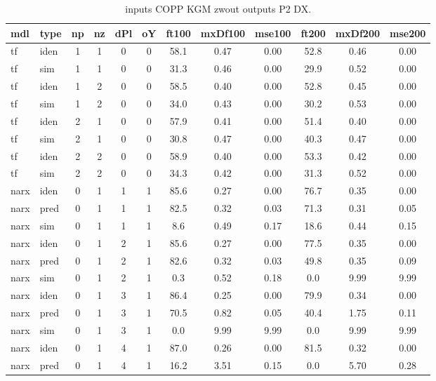 \begin{landscape}
\begin{center} 
\footnotesize
\begin{longtable}{ll|cccc|ccc|ccc} 
\caption[inputs COPP KGM zwout   outputs P2 DX]{inputs COPP KGM zwout   outputs P2 DX.} 
\label{tab:inputs_COPP_KGM_zwout___outputs_P2_DX} 
\hline 
  mdl & type & np & nz & dPl & oY & ft100 & mxDf100 & mse100 & ft200 & mxDf200 & mse200 \\ 
 \hline 
tf  & iden & 1 & 1 & 0 & 0 & 58.1 & 0.47 & 0.00 & 52.8 & 0.46 & 0.00 \\ 
tf  & sim & 1 & 1 & 0 & 0 & 31.3 & 0.46 & 0.00 & 29.9 & 0.52 & 0.00 \\ 
 \hline 
tf  & iden & 1 & 2 & 0 & 0 & 58.5 & 0.40 & 0.00 & 52.8 & 0.45 & 0.00 \\ 
tf  & sim & 1 & 2 & 0 & 0 & 34.0 & 0.43 & 0.00 & 30.2 & 0.53 & 0.00 \\ 
 \hline 
tf  & iden & 2 & 1 & 0 & 0 & 57.9 & 0.41 & 0.00 & 51.4 & 0.40 & 0.00 \\ 
tf  & sim & 2 & 1 & 0 & 0 & 30.8 & 0.47 & 0.00 & 40.3 & 0.47 & 0.00 \\ 
 \hline 
tf  & iden & 2 & 2 & 0 & 0 & 58.9 & 0.40 & 0.00 & 53.3 & 0.42 & 0.00 \\ 
tf  & sim & 2 & 2 & 0 & 0 & 34.3 & 0.42 & 0.00 & 31.3 & 0.52 & 0.00 \\ 
 \hline 
narx & iden & 0 & 1 & 1 & 1 & 85.6 & 0.27 & 0.00 & 76.7 & 0.35 & 0.00 \\ 
narx & pred & 0 & 1 & 1 & 1 & 82.5 & 0.32 & 0.03 & 71.3 & 0.31 & 0.05 \\ 
narx & sim & 0 & 1 & 1 & 1 & 8.6 & 0.49 & 0.17 & 18.6 & 0.44 & 0.15 \\ 
 \hline 
narx & iden & 0 & 1 & 2 & 1 & 85.6 & 0.27 & 0.00 & 77.5 & 0.35 & 0.00 \\ 
narx & pred & 0 & 1 & 2 & 1 & 82.6 & 0.32 & 0.03 & 49.8 & 0.35 & 0.09 \\ 
narx & sim & 0 & 1 & 2 & 1 & 0.3 & 0.52 & 0.18 & 0.0 & 9.99 & 9.99 \\ 
 \hline 
narx & iden & 0 & 1 & 3 & 1 & 86.4 & 0.25 & 0.00 & 79.9 & 0.34 & 0.00 \\ 
narx & pred & 0 & 1 & 3 & 1 & 70.5 & 0.82 & 0.05 & 40.4 & 1.75 & 0.11 \\ 
narx & sim & 0 & 1 & 3 & 1 & 0.0 & 9.99 & 9.99 & 0.0 & 9.99 & 9.99 \\ 
 \hline 
narx & iden & 0 & 1 & 4 & 1 & 87.0 & 0.26 & 0.00 & 81.5 & 0.32 & 0.00 \\ 
narx & pred & 0 & 1 & 4 & 1 & 16.2 & 3.51 & 0.15 & 0.0 & 5.70 & 0.28 \\ 

\end{longtable}
\end{center}
\end{landscape}
